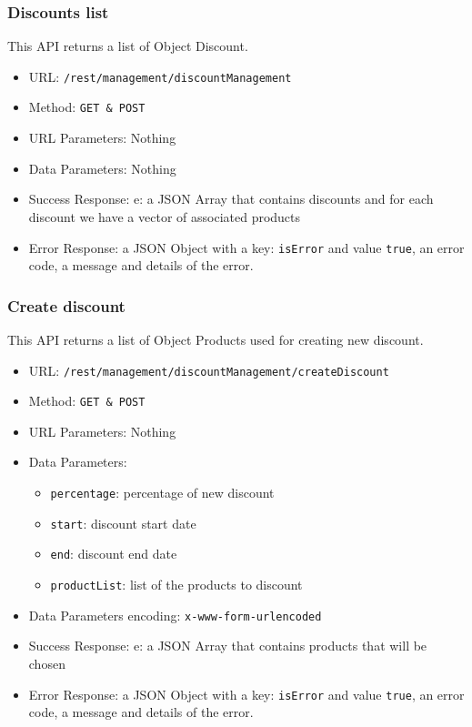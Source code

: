 \subsubsection*{Discounts list}
This API returns a list of Object Discount.

\begin{itemize}
    \item URL: \texttt{/rest/management/discountManagement}
    \item Method: \texttt{{GET \& POST}}
    \item URL Parameters: Nothing
    \item Data Parameters: Nothing
    \item Success Response: e: a JSON Array that contains discounts and for each discount we have a vector of associated products
    \item Error Response: a JSON Object with a key: \texttt{isError}  and value \texttt{true}, an error code, a message and details of the error.
\end{itemize}

\subsubsection*{Create discount}
This API returns a list of Object Products used for creating new discount.

\begin{itemize}
    \item URL: \texttt{/rest/management/discountManagement/createDiscount}
    \item Method: \texttt{{GET \& POST}}
    \item URL Parameters: Nothing
    \item Data Parameters: 
    \begin{itemize}
        \item \texttt{percentage}: percentage of new discount
        \item \texttt{start}: discount start date
        \item \texttt{end}: discount end date
        \item \texttt{productList}: list of the products to discount
    \end{itemize}
    \item Data Parameters encoding: \texttt{x-www-form-urlencoded}
    \item Success Response: e: a JSON Array that contains products that will be chosen
    \item Error Response: a JSON Object with a key: \texttt{isError}  and value \texttt{true}, an error code, a message and details of the error.
\end{itemize}

